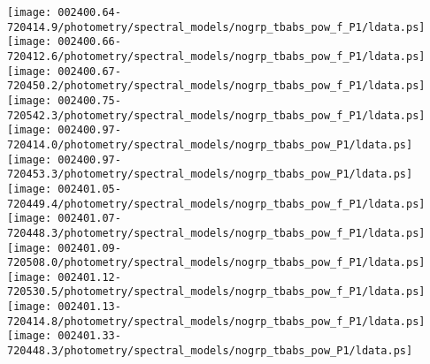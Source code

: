 \documentclass{aastex}
\begin{document}
\begin{figure*}[!ht]
\centering
\texttt{[image: 002400.64-720414.9/photometry/spectral\_models/nogrp\_tbabs\_pow\_f\_P1/ldata.ps]} \hfill 
\texttt{[image: 002400.66-720412.6/photometry/spectral\_models/nogrp\_tbabs\_pow\_f\_P1/ldata.ps]} \hfill 
\texttt{[image: 002400.67-720450.2/photometry/spectral\_models/nogrp\_tbabs\_pow\_f\_P1/ldata.ps]} \\ 
\vspace*{0.5in}
\texttt{[image: 002400.75-720542.3/photometry/spectral\_models/nogrp\_tbabs\_pow\_f\_P1/ldata.ps]} \hfill 
\texttt{[image: 002400.97-720414.0/photometry/spectral\_models/nogrp\_tbabs\_pow\_P1/ldata.ps]} \hfill 
\texttt{[image: 002400.97-720453.3/photometry/spectral\_models/nogrp\_tbabs\_pow\_P1/ldata.ps]} \\ 
\vspace*{0.5in}
\texttt{[image: 002401.05-720449.4/photometry/spectral\_models/nogrp\_tbabs\_pow\_f\_P1/ldata.ps]} \hfill 
\texttt{[image: 002401.07-720448.3/photometry/spectral\_models/nogrp\_tbabs\_pow\_f\_P1/ldata.ps]} \hfill 
\texttt{[image: 002401.09-720508.0/photometry/spectral\_models/nogrp\_tbabs\_pow\_f\_P1/ldata.ps]} \\ 
\vspace*{0.5in}
\texttt{[image: 002401.12-720530.5/photometry/spectral\_models/nogrp\_tbabs\_pow\_f\_P1/ldata.ps]} \hfill 
\texttt{[image: 002401.13-720414.8/photometry/spectral\_models/nogrp\_tbabs\_pow\_f\_P1/ldata.ps]} \hfill 
\texttt{[image: 002401.33-720448.3/photometry/spectral\_models/nogrp\_tbabs\_pow\_P1/ldata.ps]} \\ 
\vspace*{0.5in}
\end{figure*}
\clearpage
\end{document}
